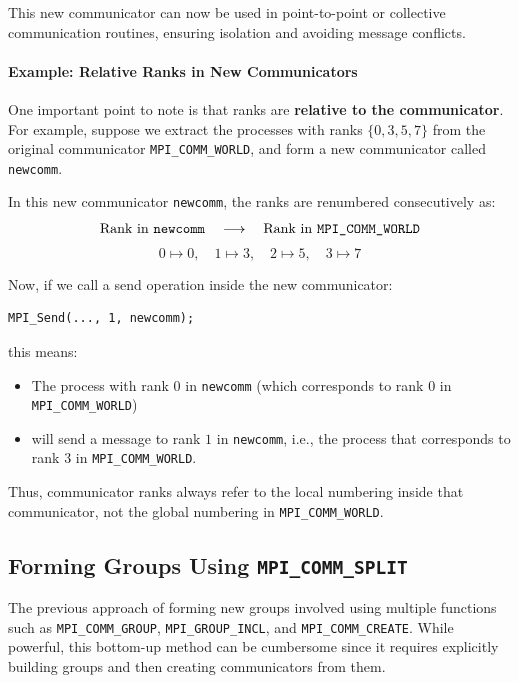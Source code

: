 \documentclass[12pt]{book}
\begin{document}
This new communicator can now be used in point-to-point or collective communication routines, ensuring isolation and avoiding message conflicts.

\paragraph{Example: Relative Ranks in New Communicators}  
One important point to note is that ranks are \textbf{relative to the communicator}.  
For example, suppose we extract the processes with ranks $\{0,3,5,7\}$ from the original communicator \texttt{MPI\_COMM\_WORLD}, and form a new communicator called \texttt{newcomm}.  

In this new communicator \texttt{newcomm}, the ranks are renumbered consecutively as:
\[
\text{Rank in \texttt{newcomm}} \quad \longrightarrow \quad \text{Rank in \texttt{MPI\_COMM\_WORLD}}
\]
\[
0 \mapsto 0, \quad 1 \mapsto 3, \quad 2 \mapsto 5, \quad 3 \mapsto 7
\]

Now, if we call a send operation inside the new communicator:
\begin{lstlisting}[style=cppstyle, caption={Send operation in new communicator}]
MPI_Send(..., 1, newcomm);
\end{lstlisting}

this means:  
\begin{itemize}
    \item The process with rank $0$ in \texttt{newcomm} (which corresponds to rank $0$ in \texttt{MPI\_COMM\_WORLD})  
    \item will send a message to rank $1$ in \texttt{newcomm}, i.e., the process that corresponds to rank $3$ in \texttt{MPI\_COMM\_WORLD}.  
\end{itemize}

Thus, communicator ranks always refer to the local numbering inside that communicator, not the global numbering in \texttt{MPI\_COMM\_WORLD}.

\subsection{Forming Groups Using \texttt{MPI\_COMM\_SPLIT}}
The previous approach of forming new groups involved using multiple functions such as \texttt{MPI\_COMM\_GROUP}, \texttt{MPI\_GROUP\_INCL}, and \texttt{MPI\_COMM\_CREATE}.  
While powerful, this bottom-up method can be cumbersome since it requires explicitly building groups and then creating communicators from them.
\end{document}
